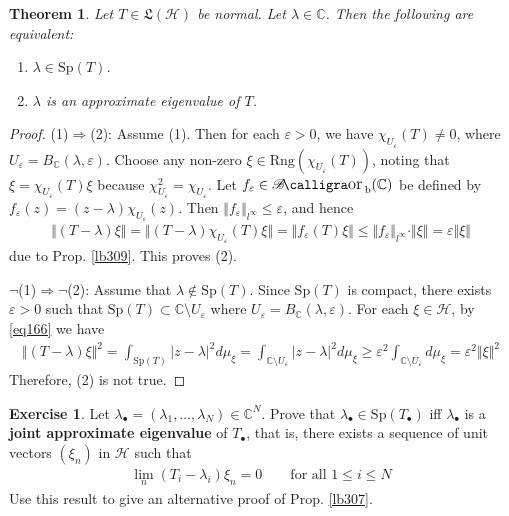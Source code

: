 \documentclass[12pt,b5paper,notitlepage]{article}
\theoremstyle{definition}
\newtheorem{exe}[df]{Exercise}
\theoremstyle{plain}
\newtheorem{thm}[df]{Theorem}
\DeclareMathOperator{\Borb}{{\mathscr{B}\text{\kern -2pt {\calligra\large or}}\,}_{\mathrm b}}
\newcommand{\fk}{\mathfrak}
\newcommand{\blt}{\bullet}
\newcommand{\Cbb}{\mathbb C}
\newcommand{\Sp}{\mathrm{Sp}}
\newcommand{\Rng}{\mathrm{Rng}}
\newcommand{\eps}{\varepsilon}
\newcommand{\MH}{\mathcal H}
\numberwithin{equation}{section}
\begin{document}
\begin{thm}\label{lb312}
Let $T\in\fk L(\MH)$ be normal. Let $\lambda\in\Cbb$. Then the following are equivalent:
\begin{enumerate}
\item[(1)] $\lambda\in\Sp(T)$.
\item[(2)] $\lambda$ is an approximate eigenvalue of $T$.
\end{enumerate}
\end{thm}


\begin{proof}
(1)$\Rightarrow$(2): Assume (1). Then for each $\eps>0$, we have $\chi_{U_\eps}(T)\neq0$, where $U_\eps=B_\Cbb(\lambda,\eps)$. Choose any non-zero $\xi\in\Rng(\chi_{U_\eps}(T))$, noting that $\xi=\chi_{U_\eps}(T)\xi$ because $\chi_{U_\eps}^2=\chi_{U_\eps}$. Let $f_\eps\in\Borb(\Cbb)$ be defined by $f_\eps(z)=(z-\lambda)\chi_{U_\eps}(z)$. Then $\Vert f_\eps\Vert_{l^\infty}\leq\eps$, and hence
\begin{align*}
\Vert (T-\lambda)\xi\Vert=\Vert (T-\lambda)\chi_{U_\eps}(T)\xi\Vert=\Vert f_\eps(T)\xi\Vert\leq \Vert f_\eps\Vert_{l^\infty}\cdot\Vert\xi\Vert=\eps\Vert\xi\Vert
\end{align*}
due to Prop. \ref{lb309}. This proves (2).

$\neg$(1)$\Rightarrow$$\neg$(2): Assume that $\lambda\notin\Sp(T)$. Since $\Sp(T)$ is compact, there exists $\eps>0$ such that $\Sp(T)\subset\Cbb\setminus U_\eps$ where $U_\eps=B_\Cbb(\lambda,\eps)$. For each $\xi\in\MH$, by \eqref{eq166} we have
\begin{align*}
\Vert(T-\lambda)\xi\Vert^2=\int_{\Sp(T)}|z-\lambda|^2d\mu_\xi=\int_{\Cbb\setminus U_\eps}|z-\lambda|^2d\mu_\xi\geq\eps^2\int_{\Cbb\setminus U_\eps}d\mu_\xi=\eps^2\Vert\xi\Vert^2
\end{align*}
Therefore, (2) is not true.
\end{proof}




\begin{exe}
Let $\lambda_\blt=(\lambda_1,\dots,\lambda_N)\in\Cbb^N$. Prove that $\lambda_\blt\in\Sp(T_\blt)$ iff $\lambda_\blt$ is a \textbf{joint approximate eigenvalue}  of $T_\blt$, that is, there exists a sequence of unit vectors $(\xi_n)$ in $\MH$ such that
\begin{align*}
\lim_n (T_i-\lambda_i)\xi_n=0\qquad\text{for all }1\leq i\leq N
\end{align*}
Use this result to give an alternative proof of Prop. \ref{lb307}.
\end{exe}
\end{document}
